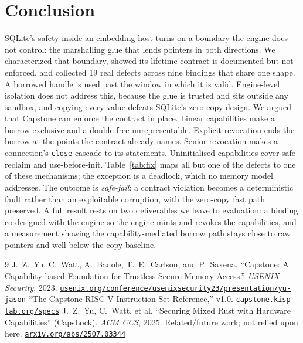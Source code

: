 \documentclass[10pt,twocolumn]{article}
\begin{document}
\section{Conclusion}
SQLite's safety inside an embedding host turns on a boundary the engine does not
control: the marshalling glue that lends pointers in both directions. We
characterized that boundary, showed its lifetime contract is documented but not
enforced, and collected 19 real defects across nine bindings that share one
shape. A borrowed handle is used past the window in which it is valid.
Engine-level isolation does not address this, because the glue is trusted and
sits outside any sandbox, and copying every value defeats SQLite's zero-copy
design. We argued that Capstone can enforce the contract in place. Linear
capabilities make a borrow exclusive and a double-free unrepresentable. Explicit
revocation ends the borrow at the points the contract already names.
Senior revocation makes a connection's \texttt{close} cascade to its statements.
Uninitialised capabilities cover safe reclaim and use-before-init. Table~\ref{tab:fix}
maps all but one of the defects to one of these mechanisms; the exception is a
deadlock, which no memory model addresses. The outcome is \emph{safe-fail}: a
contract violation becomes a deterministic fault rather than an exploitable
corruption, with the zero-copy fast path preserved. A full result rests on two
deliverables we leave to evaluation: a binding co-designed with the engine so
the engine mints and revokes the capabilities, and a measurement showing the
capability-mediated borrow path stays close to raw pointers and well below the
copy baseline.

\begin{thebibliography}{9}
\footnotesize
{} J.~Z.~Yu, C.~Watt, A.~Badole, T.~E.~Carlson, and P.~Saxena.
``Capstone: A Capability-based Foundation for Trustless Secure Memory Access.''
\emph{USENIX Security}, 2023.
\href{https://www.usenix.org/conference/usenixsecurity23/presentation/yu-jason}{\nolinkurl{usenix.org/conference/usenixsecurity23/presentation/yu-jason}}
 ``The Capstone-RISC-V Instruction Set Reference,'' v1.0.
\href{https://capstone.kisp-lab.org/specs/}{\nolinkurl{capstone.kisp-lab.org/specs}}
 J.~Z.~Yu, C.~Watt, et al.
``Securing Mixed Rust with Hardware Capabilities'' (CapsLock).
\emph{ACM CCS}, 2025. Related/future work; not relied upon here.
\href{https://arxiv.org/abs/2507.03344}{\nolinkurl{arxiv.org/abs/2507.03344}}
\end{thebibliography}
\end{document}
